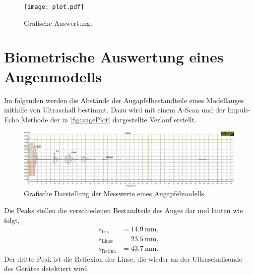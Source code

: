 \begin{figure}[H]
  \centering
  \texttt{[image: plot.pdf]}
  \caption{Grafische Auswertung.}
  \label{fig:plot}
\end{figure}

\section{Biometrische Auswertung eines Augenmodells}
\label{sec:auge}

Im folgenden werden die Abstände der Augapfelbestandteile eines Modellauges mithilfe von Ultraschall bestimmt. 
Dazu wird mit einem A-Scan und der Impuls-Echo Methode der in \autoref{fig:augePlot} dargestellte Verlauf erstellt.

\begin{figure}[H]
  \centering
  \includegraphics[width = \textwidth]{data/Auge.png}
  \caption{Grafische Darstellung der Messwerte eines Augapfelmodells.}
  \label{fig:augePlot}
\end{figure}

Die Peaks stellen die verschiedenen Bestandteile des Auges dar und lauten wie folgt,
\begin{align*}
  s_{\text{Iris}} &= \SI{14,9}{\mm}, \\
  s_{\text{Linse}} &= \SI{23,5}{\mm}, \\
  s_{\text{Retina}} &= \SI{43,7}{\mm}.
\end{align*}
Der dritte Peak ist die Relfexion der Linse, die wieder an der Ultraschallsonde des Gerätes detektiert wird.